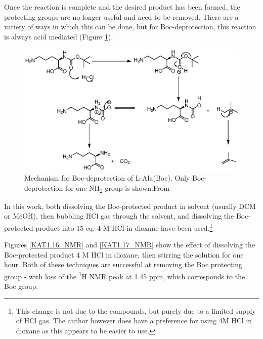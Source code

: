 Once the reaction is complete and the desired product has been formed, the protecting groups are no longer useful and need to be removed. There are a variety of ways in which this can be done, but for Boc-deprotection, this reaction is always acid mediated  (Figure \ref{Boc_deprotection}).
\begin{figure}[ht!]
\centering
\includegraphics[scale=1]{Figures/Boc_deprotection.eps}
\caption{Mechanism for Boc-deprotection of L-Ala(Boc). Only Boc-deprotection for one NH\textsubscript{2} group is shown.From \cite{Clayden2012OrganicChemistry}} 
\label{Boc_deprotection}
\end{figure}
\newpage
In this work, both dissolving the Boc-protected product in solvent (usually DCM or MeOH), then bubbling HCl gas through the solvent, and dissolving the Boc-protected product into 15 eq. 4 M HCl in dioxane have been used.\footnote{This change is not due to the compounds, but purely due to a limited supply of HCl gas. The author however does have a preference for using 4M HCl in dioxane as this appears to be easier to use.}

Figures \ref{KAT1.16_NMR} and \ref{KAT1.17_NMR} show the effect of dissolving the Boc-protected product 4 M HCl in dioxane, then stirring the solution for one hour. 
Both of these techniques are successful at removing the Boc protecting group - with loss of the \textsuperscript{1}H NMR peak at 1.45 ppm, which corresponds to the Boc group.

